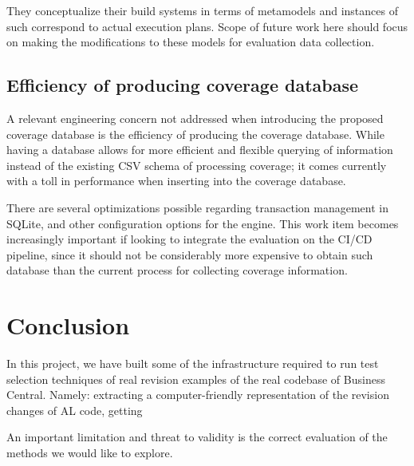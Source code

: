\documentclass{article}
\begin{document}
 They conceptualize their build systems in terms of metamodels and instances of such correspond to actual execution plans. Scope of future work here should focus on making the modifications to these models for evaluation data collection.

\subsection{Efficiency of producing coverage database}
A relevant engineering concern not addressed when introducing the proposed coverage database is the efficiency of producing the coverage database. While having a database allows for more efficient and flexible querying of information instead of the existing CSV schema of processing coverage; it comes currently with a toll in performance when inserting into the coverage database.

There are several optimizations possible regarding transaction management in SQLite, and other configuration options for the engine. This work item becomes increasingly important if looking to integrate the evaluation on the CI/CD pipeline, since it should not be considerably more expensive to obtain such database than the current process for collecting coverage information.

\section{Conclusion}
In this project, we have built some of the infrastructure required to run test selection techniques of real revision examples of the real codebase of Business Central. Namely: extracting a computer-friendly representation of the revision changes of AL code, getting

An important limitation and threat to validity is the correct evaluation of the methods we would like to explore.

\printbibliography
\end{document}
